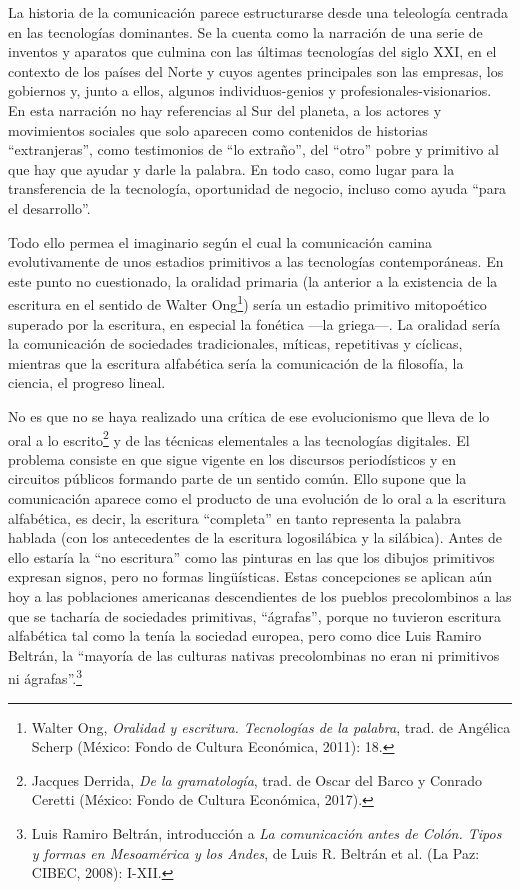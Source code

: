 \documentclass{tufte-handout}
\begin{document}
La historia de la comunicación parece estructurarse desde una teleología
centrada en las tecnologías dominantes. Se la cuenta como la narración
de una serie de inventos y aparatos que culmina con las últimas
tecnologías del siglo XXI, en el contexto de los países del Norte y
cuyos agentes principales son las empresas, los gobiernos y, junto a
ellos, algunos individuos-genios y profesionales-visionarios. En esta
narración no hay referencias al Sur del planeta, a los actores y
movimientos sociales que solo aparecen como contenidos de historias
``extranjeras'', como testimonios de ``lo extraño'', del ``otro'' pobre
y primitivo al que hay que ayudar y darle la palabra. En todo caso, como
lugar para la transferencia de la tecnología, oportunidad de negocio,
incluso como ayuda ``para el desarrollo''.

Todo ello permea el imaginario según el cual la comunicación camina
evolutivamente de unos estadios primitivos a las tecnologías
contemporáneas. En este punto no cuestionado, la oralidad primaria (la
anterior a la existencia de la escritura en el sentido de Walter
Ong\footnote{Walter Ong, \emph{Oralidad y escritura. Tecnologías de la
  palabra}, trad. de Angélica Scherp (México: Fondo de Cultura
  Económica, 2011): 18.}) sería un estadio primitivo mitopoético
superado por la escritura, en especial la fonética ---la griega---. La
oralidad sería la comunicación de sociedades tradicionales, míticas,
repetitivas y cíclicas, mientras que la escritura alfabética sería la
comunicación de la filosofía, la ciencia, el progreso lineal.

No es que no se haya realizado una crítica de ese evolucionismo que
lleva de lo oral a lo escrito\footnote{Jacques Derrida, \emph{De la
  gramatología}, trad. de Oscar del Barco y Conrado Ceretti (México:
  Fondo de Cultura Económica, 2017).} y de las técnicas elementales a
las tecnologías digitales. El problema consiste en que sigue vigente en
los discursos periodísticos y en circuitos públicos formando parte de un
sentido común. Ello supone que la comunicación aparece como el producto
de una evolución de lo oral a la escritura alfabética, es decir, la
escritura ``completa'' en tanto representa la palabra hablada (con los
antecedentes de la escritura logosilábica y la silábica). Antes de ello
estaría la ``no escritura'' como las pinturas en las que los dibujos
primitivos expresan signos, pero no formas lingüísticas. Estas
concepciones se aplican aún hoy a las poblaciones americanas
descendientes de los pueblos precolombinos a las que se tacharía de
sociedades primitivas, ``ágrafas'', porque no tuvieron escritura
alfabética tal como la tenía la sociedad europea, pero como dice Luis
Ramiro Beltrán, la ``mayoría de las culturas nativas precolombinas no
eran ni primitivos ni ágrafas''.\footnote{Luis Ramiro Beltrán,
  introducción a \emph{La comunicación antes de Colón. Tipos y formas en
  Mesoamérica y los Andes}, de Luis R. Beltrán et al. (La Paz: CIBEC,
  2008): I-XII.}
\end{document}
